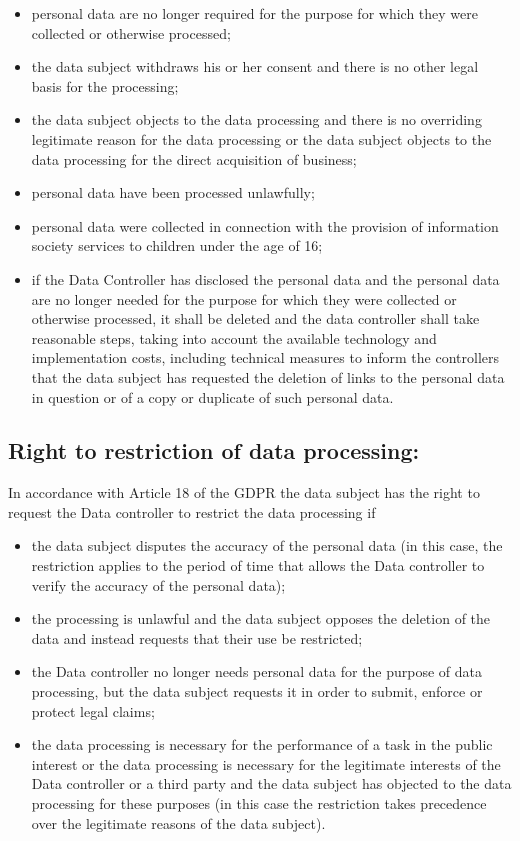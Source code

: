 \documentclass[11pt]{article}
\begin{document}
\begin{itemize}
    \item personal data are no longer required for the purpose for which they were collected or otherwise processed;
    \item the data subject withdraws his or her consent and there is no other legal basis for the processing;
    \item the data subject objects to the data processing and there is no overriding legitimate reason for the data processing or the data subject objects to the data processing for the direct acquisition of business;
    \item personal data have been processed unlawfully;
    \item personal data were collected in connection with the provision of information society services to children under the age of 16;
    \item if the Data Controller has disclosed the personal data and the personal data are no longer needed for the purpose for which they were collected or otherwise processed, it shall be deleted and the data controller shall take reasonable steps, taking into account the available technology and implementation costs, including technical measures to inform the controllers that the data subject has requested the deletion of links to the personal data in question or of a copy or duplicate of such personal data. 
\end{itemize}


\subsection{Right to restriction of data processing:}
In accordance with Article 18 of the GDPR the data subject has the right to request the Data controller to restrict the data processing if
\begin{itemize}
    \item the data subject disputes the accuracy of the personal data (in this case, the restriction applies to the period of time that allows the Data controller to verify the accuracy of the personal data);
    \item the processing is unlawful and the data subject opposes the deletion of the data and instead requests that their use be restricted;
    \item the Data controller no longer needs personal data for the purpose of data processing, but the data subject requests it in order to submit, enforce or protect legal claims;
    \item the data processing is necessary for the performance of a task in the public interest or the data processing is necessary for the legitimate interests of the Data controller or a third party and the data subject has objected to the data processing for these purposes (in this case the restriction takes precedence over the legitimate reasons of the data subject).
\end{itemize}
\end{document}
